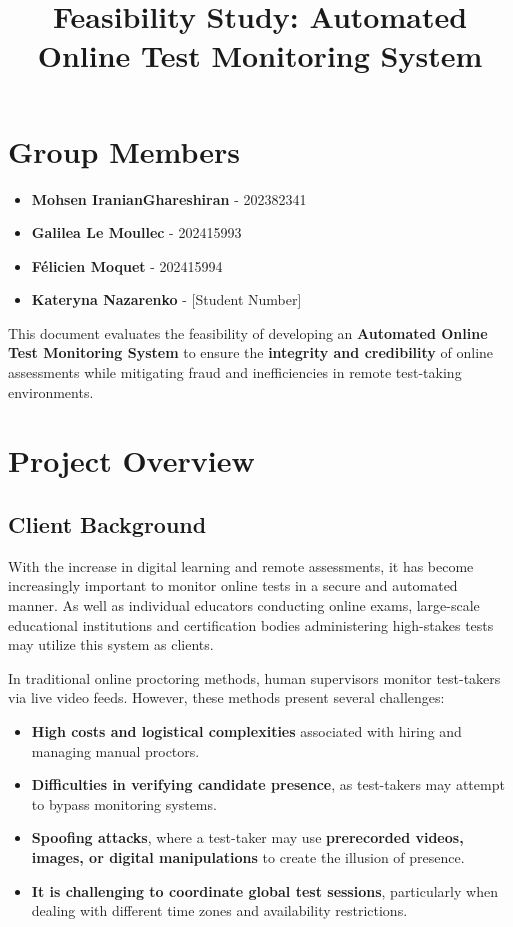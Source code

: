 \documentclass[12pt,a4paper]{article}
\title{\textbf{Feasibility Study: Automated Online Test Monitoring System}}
\author{}
\date{}
\begin{document}
\maketitle

\section*{Group Members}
\vspace{-5pt}
\begin{itemize}
    \item \textbf{Mohsen IranianGhareshiran} - 202382341
    \item \textbf{Galilea Le Moullec} - 202415993
    \item \textbf{Félicien Moquet} - 202415994
    \item \textbf{Kateryna Nazarenko} - [Student Number]
\end{itemize}

\noindent This document evaluates the feasibility of developing an \textbf{Automated Online Test Monitoring System} to ensure the \textbf{integrity and credibility} of online assessments while mitigating fraud and inefficiencies in remote test-taking environments.

\tableofcontents
\newpage

\section{Project Overview}

\subsection{Client Background}
With the increase in digital learning and remote assessments, it has become increasingly important to monitor online tests in a secure and automated manner. As well as individual educators conducting online exams, large-scale educational institutions and certification bodies administering high-stakes tests may utilize this system as clients.

In traditional online proctoring methods, human supervisors monitor test-takers via live video feeds. However, these methods present several challenges:
\begin{itemize}
    \item \textbf{High costs and logistical complexities} associated with hiring and managing manual proctors.
    \item \textbf{Difficulties in verifying candidate presence}, as test-takers may attempt to bypass monitoring systems.
    \item \textbf{Spoofing attacks}, where a test-taker may use \textbf{prerecorded videos, images, or digital manipulations} to create the illusion of presence.
    \item \textbf{It is challenging to coordinate global test sessions}, particularly when dealing with different time zones and availability restrictions.
\end{itemize}
\end{document}
